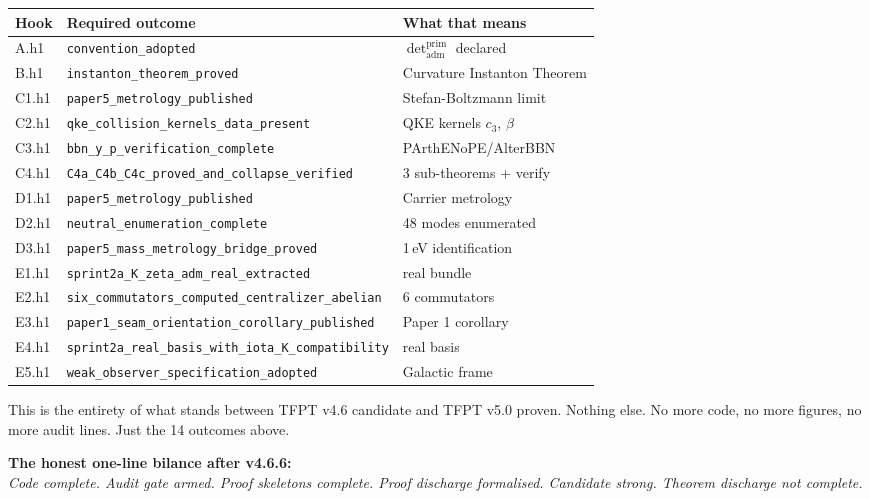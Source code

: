 \begin{center}\small
\begin{tabular}{@{}lll@{}}
\toprule
\textbf{Hook} & \textbf{Required outcome} & \textbf{What that means} \\
\midrule
A.h1 & \texttt{convention\_adopted} & \(\det_{\mathrm{adm}}^{\mathrm{prim}}\) declared \\
B.h1 & \texttt{instanton\_theorem\_proved} & Curvature Instanton Theorem \\
C1.h1 & \texttt{paper5\_metrology\_published} & Stefan-Boltzmann limit \\
C2.h1 & \texttt{qke\_collision\_kernels\_data\_present} & QKE kernels \(c_3\), \(\beta\) \\
C3.h1 & \texttt{bbn\_y\_p\_verification\_complete} & PArthENoPE/AlterBBN \\
C4.h1 & \texttt{C4a\_C4b\_C4c\_proved\_and\_collapse\_verified} & 3 sub-theorems + verify \\
D1.h1 & \texttt{paper5\_metrology\_published} & Carrier metrology \\
D2.h1 & \texttt{neutral\_enumeration\_complete} & 48 modes enumerated \\
D3.h1 & \texttt{paper5\_mass\_metrology\_bridge\_proved} & 1\,eV identification \\
E1.h1 & \texttt{sprint2a\_K\_zeta\_adm\_real\_extracted} & real bundle \\
E2.h1 & \texttt{six\_commutators\_computed\_centralizer\_abelian} & 6 commutators \\
E3.h1 & \texttt{paper1\_seam\_orientation\_corollary\_published} & Paper 1 corollary \\
E4.h1 & \texttt{sprint2a\_real\_basis\_with\_iota\_K\_compatibility} & real basis \\
E5.h1 & \texttt{weak\_observer\_specification\_adopted} & Galactic frame \\
\bottomrule
\end{tabular}
\end{center}

This is the entirety of what stands between TFPT v4.6 candidate and
TFPT v5.0 proven.  Nothing else.  No more code, no more figures, no
more audit lines.  Just the 14 outcomes above.

\begin{tfptfrontbox}
\textbf{The honest one-line bilance after v4.6.6:}\\
\emph{Code complete. Audit gate armed. Proof skeletons complete.
Proof discharge formalised. Candidate strong. Theorem discharge not
complete.}
\end{tfptfrontbox}


